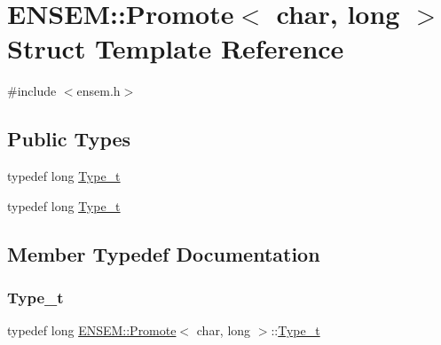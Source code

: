 \hypertarget{structENSEM_1_1Promote_3_01char_00_01long_01_4}{}\section{E\+N\+S\+EM\+:\+:Promote$<$ char, long $>$ Struct Template Reference}
\label{structENSEM_1_1Promote_3_01char_00_01long_01_4}


{\ttfamily \#include $<$ensem.\+h$>$}

\subsection*{Public Types}
\begin{DoxyCompactItemize}
\item 
typedef long \mbox{\hyperlink{structENSEM_1_1Promote_3_01char_00_01long_01_4_af2c2227ccd58ab5b06ad3e9b368ec6d3}{Type\+\_\+t}}
\item 
typedef long \mbox{\hyperlink{structENSEM_1_1Promote_3_01char_00_01long_01_4_af2c2227ccd58ab5b06ad3e9b368ec6d3}{Type\+\_\+t}}
\end{DoxyCompactItemize}


\subsection{Member Typedef Documentation}
\mbox{\label{structENSEM_1_1Promote_3_01char_00_01long_01_4_af2c2227ccd58ab5b06ad3e9b368ec6d3}} 
\subsubsection{\texorpdfstring{Type\_t}{Type\_t}\hspace{0.1cm}{\footnotesize\ttfamily [1/2]}}
{\footnotesize\ttfamily typedef long \mbox{\hyperlink{structENSEM_1_1Promote}{E\+N\+S\+E\+M\+::\+Promote}}$<$ char, long $>$\+::\mbox{\hyperlink{structENSEM_1_1Promote_3_01char_00_01long_01_4_af2c2227ccd58ab5b06ad3e9b368ec6d3}{Type\+\_\+t}}}

\mbox{\label{structENSEM_1_1Promote_3_01char_00_01long_01_4_af2c2227ccd58ab5b06ad3e9b368ec6d3}} 
